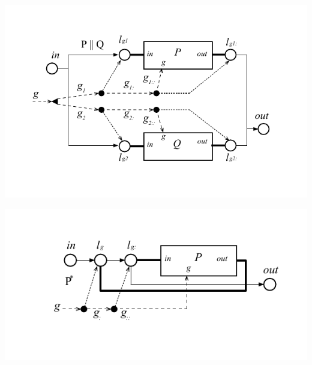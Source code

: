 \documentclass{llncs}
\begin{document}
\includegraphics[scale=0.8]{images/PAR}

\includegraphics[scale=0.8]{images/STAR}

\newpage






% 
% 
% 
% 
% 
% 
% 
\end{document}
